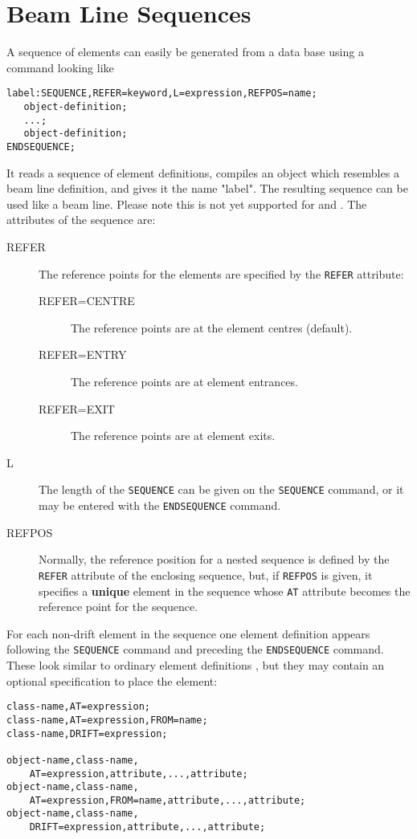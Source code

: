 \section{Beam Line Sequences}
\label{sec:sequence}
A sequence of elements can easily be generated from a data base
using a command looking like
\begin{verbatim}
label:SEQUENCE,REFER=keyword,L=expression,REFPOS=name;
   object-definition;
   ...;
   object-definition;
ENDSEQUENCE;
\end{verbatim}
It reads a sequence of element definitions,
compiles an object which resembles a beam line definition,
and gives it the name "label".
The resulting sequence can be used like a beam line.
Please note this is not yet supported for \noopalt and \noopalcycl.
The attributes of the sequence are:
\begin{description}
\item[REFER]
  The reference points for the elements are specified by the \texttt{REFER}
  attribute:
  \begin{description}
  \item[REFER=CENTRE]
    The reference points are at the element centres (default).
  \item[REFER=ENTRY]
    The reference points are at element entrances.
  \item[REFER=EXIT]
    The reference points are at element exits.
  \end{description}
\item[L]
  The length of the \texttt{SEQUENCE} can be given on the
  \texttt{SEQUENCE} command,
  or it may be entered with the \texttt{ENDSEQUENCE} command.
\item[REFPOS]
  Normally, the reference position for a nested sequence is defined by
  the \texttt{REFER} attribute of the enclosing sequence,
  but, if \texttt{REFPOS} is given, it specifies a \textbf{unique}
  element in the sequence whose \texttt{AT} attribute becomes the
  reference point for the sequence.
\end{description}
For each non-drift element in the sequence one element definition appears
following the \texttt{SEQUENCE} command and preceding the
\texttt{ENDSEQUENCE} command.
These look similar to ordinary element definitions ,
but they may contain an optional specification to place the element:
\begin{verbatim}
class-name,AT=expression;
class-name,AT=expression,FROM=name;
class-name,DRIFT=expression;

object-name,class-name,
	AT=expression,attribute,...,attribute;
object-name,class-name,
	AT=expression,FROM=name,attribute,...,attribute;
object-name,class-name,
	DRIFT=expression,attribute,...,attribute;
\end{verbatim}
